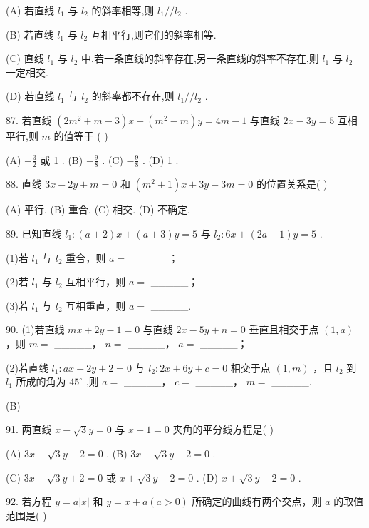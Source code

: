 \documentclass[10pt]{article}
\begin{document}
(A) 若直线 \({l}_{1}\) 与 \({l}_{2}\) 的斜率相等,则 \({l}_{1}//{l}_{2}\) .

(B) 若直线 \({l}_{1}\) 与 \({l}_{2}\) 互相平行,则它们的斜率相等.

(C) 直线 \({l}_{1}\) 与 \({l}_{2}\) 中,若一条直线的斜率存在,另一条直线的斜率不存在,则 \({l}_{1}\) 与 \({l}_{2}\) 一定相交.

(D) 若直线 \({l}_{1}\) 与 \({l}_{2}\) 的斜率都不存在,则 \({l}_{1}//{l}_{2}\) .

87. 若直线 \(\left( {2{m}^{2} + m - 3}\right) x + \left( {{m}^{2} - m}\right) y = {4m} - 1\) 与直线 \({2x} - {3y} = 5\) 互相平行,则 \(m\) 的值等于 ( )

(A) \(- \frac{3}{2}\) 或 1 . (B) \(- \frac{9}{8}\) . (C) \(- \frac{9}{8}\) . (D) 1 .

88. 直线 \({3x} - {2y} + m = 0\) 和 \(\left( {{m}^{2} + 1}\right) x + {3y} - {3m} = 0\) 的位置关系是( )

(A) 平行. (B) 重合. (C) 相交. (D) 不确定.

89. 已知直线 \({l}_{1} : \left( {a + 2}\right) x + \left( {a + 3}\right) y = 5\) 与 \({l}_{2} : {6x} + \left( {{2a} - 1}\right) y = 5\) .

(1)若 \({l}_{1}\) 与 \({l}_{2}\) 重合，则 \(a =\) \_\_\_\_\_；

(2)若 \({l}_{1}\) 与 \({l}_{2}\) 互相平行，则 \(a =\) \_\_\_\_\_；

(3)若 \({l}_{1}\) 与 \({l}_{2}\) 互相重直，则 \(a =\) \_\_\_\_\_.

90. (1)若直线 \({mx} + {2y} - 1 = 0\) 与直线 \({2x} - {5y} + n = 0\) 垂直且相交于点 \(\left( {1,a}\right)\) ，则 \(m =\) \_\_\_\_\_， \(n =\) \_\_\_\_\_， \(a =\) \_\_\_\_\_；

(2)若直线 \({l}_{1} : {ax} + {2y} + 2 = 0\) 与 \({l}_{2} : {2x} + {6y} + c = 0\) 相交于点 \(\left( {1,m}\right)\) ，且 \({l}_{2}\) 到 \({l}_{1}\) 所成的角为 \({45}^{ \circ  }\) ,则 \(a =\) \_\_\_\_\_， \(c =\) \_\_\_\_\_， \(m =\) \_\_\_\_\_.

(B)

91. 两直线 \(x - \sqrt{3}y = 0\) 与 \(x - 1 = 0\) 夹角的平分线方程是( )

(A) \({3x} - \sqrt{3}y - 2 = 0\) . (B) \({3x} - \sqrt{3}y + 2 = 0\) .

(C) \({3x} - \sqrt{3}y + 2 = 0\) 或 \(x + \sqrt{3}y - 2 = 0\) . (D) \(x + \sqrt{3}y - 2 = 0\) .

92. 若方程 \(y = a\left| x\right|\) 和 \(y = x + a\left( {a > 0}\right)\) 所确定的曲线有两个交点，则 \(a\) 的取值范围是( )
\end{document}
